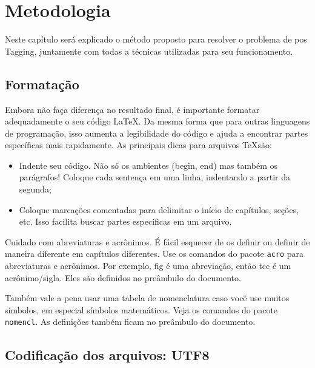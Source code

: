 \chapter{Metodologia}\label{desenvolvimento}

Neste capítulo será explicado o método proposto para resolver o problema de \ac{pos} Tagging, juntamente com todas a técnicas utilizadas para seu funcionamento.
  

\section{Formatação}

Embora não faça diferença no resultado final, é importante formatar adequadamente o seu código \LaTeX.
  Da mesma forma que para outras linguagens de programação, isso aumenta a legibilidade do código e ajuda a encontrar partes específicas mais rapidamente.
  As principais dicas para arquivos \TeX são:
 \begin{itemize}
   \item Indente seu código. Não só os ambientes (begin, end) mas também os parágrafos! Coloque cada sentença em uma linha, indentando a partir da segunda;
   \item Coloque marcações comentadas para delimitar o início de capítulos, seções, etc. Isso facilita buscar partes específicas em um arquivo.
 \end{itemize}
    
Cuidado com abreviaturas e acrônimos.
  É fácil esquecer de os definir ou definir de maneira diferente em capítulos diferentes.
  Use os comandos do pacote \texttt{acro} para abreviaturas e acrônimos.
  Por exemplo, \ac{fig} é uma abreviação, então \ac{tcc} é um acrônimo/sigla.
  Eles são definidos no preâmbulo do documento.
  
Também vale a pena usar uma tabela de nomenclatura caso você use muitos símbolos, em especial símbolos matemáticos.
  Veja os comandos do pacote \texttt{nomencl}.
  As definições também ficam no preâmbulo do documento.


\section{Codificação dos arquivos: UTF8}

